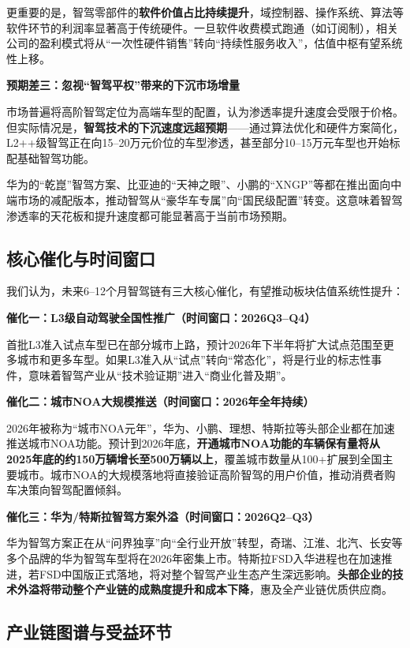更重要的是，智驾零部件的\textbf{软件价值占比持续提升}，域控制器、操作系统、算法等软件环节的利润率显著高于传统硬件。一旦软件收费模式跑通（如订阅制），相关公司的盈利模式将从“一次性硬件销售”转向“持续性服务收入”，估值中枢有望系统性上移。

\textbf{预期差三：忽视“智驾平权”带来的下沉市场增量}

市场普遍将高阶智驾定位为高端车型的配置，认为渗透率提升速度会受限于价格。但实际情况是，\textbf{智驾技术的下沉速度远超预期}——通过算法优化和硬件方案简化，L2++级智驾正在向15--20万元价位的车型渗透，甚至部分10--15万元车型也开始标配基础智驾功能。

华为的“乾崑”智驾方案、比亚迪的“天神之眼”、小鹏的“XNGP”等都在推出面向中端市场的减配版本，推动智驾从“豪华车专属”向“国民级配置”转变。这意味着智驾渗透率的天花板和提升速度都可能显著高于当前市场预期。

\subsection{核心催化与时间窗口}

我们认为，未来6--12个月智驾链有三大核心催化，有望推动板块估值系统性提升：

\textbf{催化一：L3级自动驾驶全国性推广（时间窗口：2026Q3--Q4）}

首批L3准入试点车型已在部分城市上路，预计2026年下半年将扩大试点范围至更多城市和更多车型。如果L3准入从“试点”转向“常态化”，将是行业的标志性事件，意味着智驾产业从“技术验证期”进入“商业化普及期”。

\textbf{催化二：城市NOA大规模推送（时间窗口：2026年全年持续）}

2026年被称为“城市NOA元年”，华为、小鹏、理想、特斯拉等头部企业都在加速推送城市NOA功能。预计到2026年底，\textbf{开通城市NOA功能的车辆保有量将从2025年底的约150万辆增长至500万辆以上}，覆盖城市数量从100+扩展到全国主要城市。城市NOA的大规模落地将直接验证高阶智驾的用户价值，推动消费者购车决策向智驾配置倾斜。

\textbf{催化三：华为/特斯拉智驾方案外溢（时间窗口：2026Q2--Q3）}

华为智驾方案正在从“问界独享”向“全行业开放”转型，奇瑞、江淮、北汽、长安等多个品牌的华为智驾车型将在2026年密集上市。特斯拉FSD入华进程也在加速推进，若FSD中国版正式落地，将对整个智驾产业生态产生深远影响。\textbf{头部企业的技术外溢将带动整个产业链的成熟度提升和成本下降}，惠及全产业链优质供应商。

\subsection{产业链图谱与受益环节}

